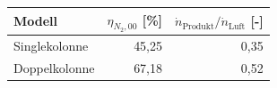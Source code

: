 \begin{tabular}{lrr}
\hline
Modell & $\eta_{N_2,00}$ [\%] & $\dot{n}_{\text{Produkt}} / \dot{n}_{\text{Luft}}$ [-] \\
\hline
Singlekolonne & 45,25 & 0,35 \\
Doppelkolonne & 67,18 & 0,52 \\
\hline
\end{tabular}
